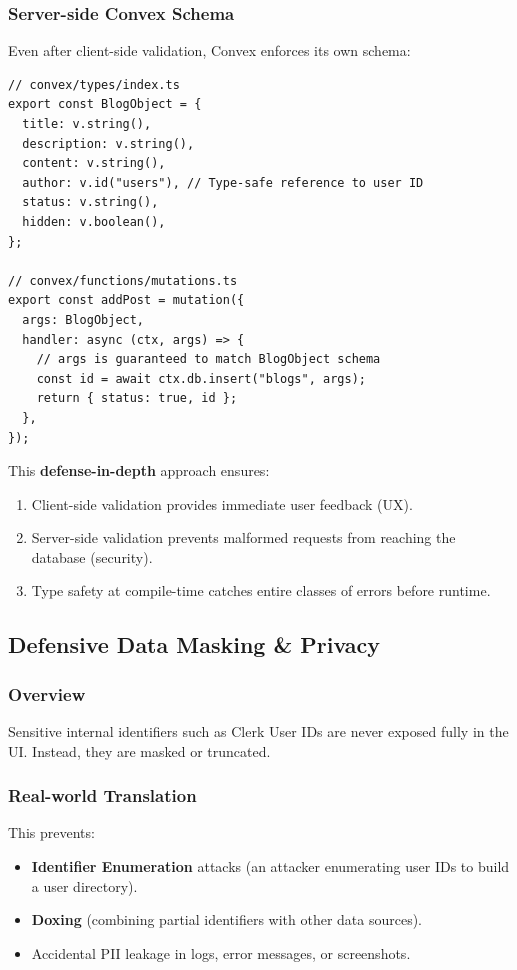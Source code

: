 \documentclass[11pt,a4paper]{article}
\begin{document}
\subsubsection{Server-side Convex Schema}
Even after client-side validation, Convex enforces its own schema:
\begin{lstlisting}
// convex/types/index.ts
export const BlogObject = {
  title: v.string(),
  description: v.string(),
  content: v.string(),
  author: v.id("users"), // Type-safe reference to user ID
  status: v.string(),
  hidden: v.boolean(),
};

// convex/functions/mutations.ts
export const addPost = mutation({
  args: BlogObject,
  handler: async (ctx, args) => {
    // args is guaranteed to match BlogObject schema
    const id = await ctx.db.insert("blogs", args);
    return { status: true, id };
  },
});
\end{lstlisting}

This \textbf{defense-in-depth} approach ensures:
\begin{enumerate}
    \item Client-side validation provides immediate user feedback (UX).
    \item Server-side validation prevents malformed requests from reaching the database (security).
    \item Type safety at compile-time catches entire classes of errors before runtime.
\end{enumerate}

\subsection{Defensive Data Masking \& Privacy}

\subsubsection{Overview}
Sensitive internal identifiers such as Clerk User IDs are never exposed fully in the UI. Instead, they are masked or truncated.

\subsubsection{Real-world Translation}
This prevents:
\begin{itemize}
    \item \textbf{Identifier Enumeration} attacks (an attacker enumerating user IDs to build a user directory).
    \item \textbf{Doxing} (combining partial identifiers with other data sources).
    \item Accidental PII leakage in logs, error messages, or screenshots.
\end{itemize}
\end{document}
